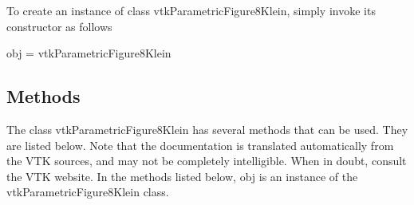 To create an instance of class vtk\-Parametric\-Figure8\-Klein, simply invoke its constructor as follows \begin{DoxyVerb}  obj = vtkParametricFigure8Klein
\end{DoxyVerb}
 \hypertarget{vtkwidgets_vtkxyplotwidget_Methods}{}\subsection{Methods}\label{vtkwidgets_vtkxyplotwidget_Methods}
The class vtk\-Parametric\-Figure8\-Klein has several methods that can be used. They are listed below. Note that the documentation is translated automatically from the V\-T\-K sources, and may not be completely intelligible. When in doubt, consult the V\-T\-K website. In the methods listed below, {\ttfamily obj} is an instance of the vtk\-Parametric\-Figure8\-Klein class. 
